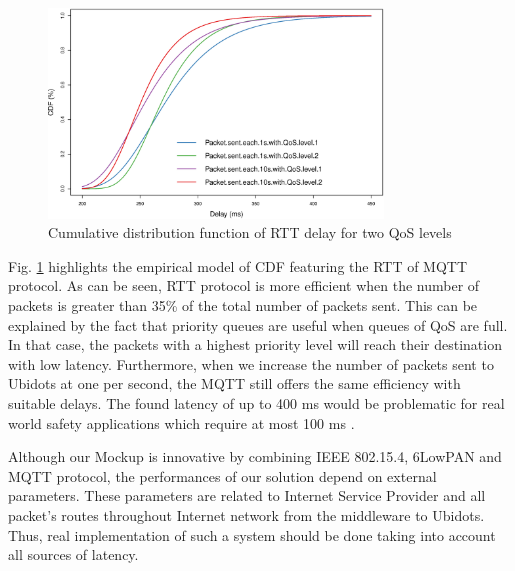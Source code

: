 \documentclass[conference]{../../setup/IEEEtran}
\makeatletter
\def\blue#1{\textcolor{beamer@blendedblue}{#1}}
\makeatother
\begin{document}
\begin{figure}[!htb]
\centering
\includegraphics[width=3.5in]{Figures/cdf_v3.eps}
\caption{Cumulative distribution function of RTT delay for two QoS levels}
\label{fig:cdf.pdf}
\end{figure}

Fig. \ref{fig:cdf.pdf} highlights the empirical model of CDF featuring the RTT of MQTT protocol. As can be seen, RTT protocol is more efficient when the number of packets is greater than 35\% of the total number of packets sent. This can be explained by the fact that priority queues are useful when queues of QoS are full. In that case, the packets with a highest priority level will reach their destination with low latency. Furthermore, when we increase the number of packets sent to Ubidots at one per second, the MQTT still offers the same efficiency with suitable delays. The found latency of up to 400 ms would be problematic for real world safety applications which require at most 100 ms \cite{Chen2017}.

Although our Mockup is innovative by combining IEEE 802.15.4, 6LowPAN and MQTT protocol, the performances of our solution depend on external parameters.  These parameters are related to Internet Service Provider and all packet's routes throughout Internet network from the middleware to Ubidots. Thus, real implementation of such a system should be done taking into account all sources of latency. 

\end{document}
